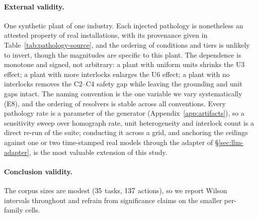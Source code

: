 \paragraph{External validity.} One synthetic plant of one industry. Each injected
pathology is nonetheless an attested property of real installations, with its
provenance given in Table~\ref{tab:pathology-source}, and the ordering of
conditions and tiers is unlikely to invert, though the magnitudes are specific to
this plant. The dependence is monotone and signed, not arbitrary: a plant with
uniform units shrinks the U3 effect; a plant with more interlocks enlarges the U6
effect; a plant with no interlocks removes the C2--C4 safety gap while leaving the
grounding and unit gaps intact. The naming convention is the one variable we vary
systematically (E8), and the ordering of resolvers is stable across all
\NSchemes{} conventions. Every pathology rate is a parameter of the generator
(Appendix~\ref{app:artifacts}), so a sensitivity sweep over homograph rate, unit
heterogeneity and interlock count is a direct re-run of the suite; conducting it
across a grid, and anchoring the ceilings against one or two time-stamped real
models through the adapter of \S\ref{sec:llm-adapter}, is the most valuable
extension of this study.

\paragraph{Conclusion validity.} The corpus sizes are modest ($35{}$ tasks,
$137{}$ actions), so we report Wilson intervals throughout and refrain from
significance claims on the smaller per-family cells.
